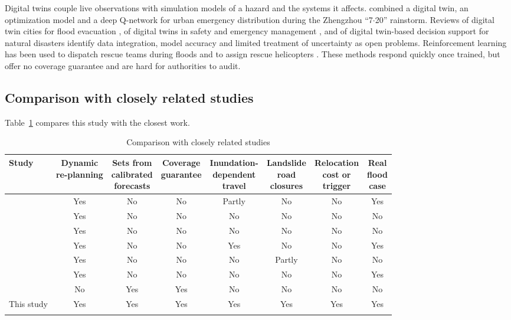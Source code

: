 \documentclass[pdflatex,sn-basic]{sn-jnl}
\theoremstyle{plain}%
\theoremstyle{remark}%
\theoremstyle{definition}%
\begin{document}
Digital twins couple live observations with simulation models of a hazard and the systems it affects. \citet{Liu2026} combined a digital twin, an optimization model and a deep Q-network for urban emergency distribution during the Zhengzhou ``7$\cdot$20'' rainstorm. Reviews of digital twin cities for flood evacuation \citep{Prihatmanto2025}, of digital twins in safety and emergency management \citep{Zio2024}, and of digital twin-based decision support for natural disasters \citep{Inyang2025} identify data integration, model accuracy and limited treatment of uncertainty as open problems. Reinforcement learning has been used to dispatch rescue teams during floods \citep{Yan2020} and to assign rescue helicopters \citep{Shen2023}. These methods respond quickly once trained, but offer no coverage guarantee and are hard for authorities to audit.

\subsection{Comparison with closely related studies}

Table~\ref{tab:gap} compares this study with the closest work.

\begin{table}[h]
\caption{Comparison with closely related studies}\label{tab:gap}
\footnotesize
\setlength{\tabcolsep}{1.2pt}
\begin{tabular*}{\textwidth}{@{\extracolsep\fill}lccccccc}
\toprule
Study & \makecell{Dynamic\\re-planning} & \makecell{Sets from\\calibrated\\forecasts} & \makecell{Coverage\\guarantee} & \makecell{Inundation-\\dependent\\travel} & \makecell{Landslide\\road\\closures} & \makecell{Relocation\\cost or\\trigger} & \makecell{Real\\flood\\case} \\
\midrule
\citet{Liu2026} & Yes & No & No & Partly & No & No & Yes \\
\citet{Attar2026} & Yes & No & No & No & No & No & No \\
\citet{Zhang2023} & Yes & No & No & No & No & No & No \\
\citet{Yan2020} & Yes & No & No & Yes & No & No & Yes \\
\citet{Avishan2023} & Yes & No & No & No & Partly & No & No \\
\citet{Manopiniwes2021} & Yes & No & No & No & No & No & Yes \\
\citet{Johnstone2021} & No & Yes & Yes & No & No & No & No \\
This study & Yes & Yes & Yes & Yes & Yes & Yes & Yes \\
\botrule
\end{tabular*}
\end{table}
\end{document}
